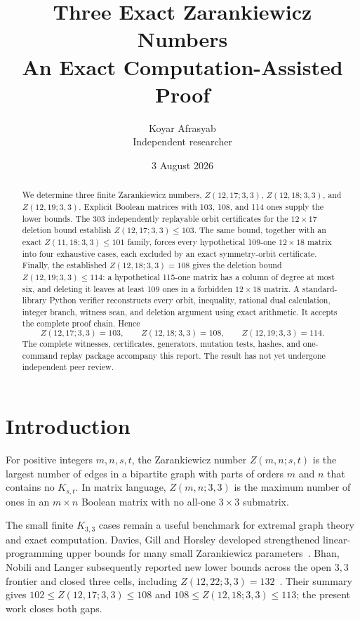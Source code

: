 \documentclass[11pt]{article}
\title{Three Exact Zarankiewicz Numbers\\\large An Exact Computation-Assisted Proof}
\author{Koyar Afrasyab\\Independent researcher}
\date{3 August 2026}
\begin{document}
\maketitle

\begin{abstract}
We determine three finite Zarankiewicz numbers, $Z(12,17;3,3)$, $Z(12,18;3,3)$, and $Z(12,19;3,3)$. Explicit Boolean matrices with 103, 108, and 114 ones supply the lower bounds. The 303 independently replayable orbit certificates for the $12\times17$ deletion bound establish $Z(12,17;3,3)\le103$. The same bound, together with an exact $Z(11,18;3,3)\le101$ family, forces every hypothetical 109-one $12\times18$ matrix into four exhaustive cases, each excluded by an exact symmetry-orbit certificate. Finally, the established $Z(12,18;3,3)=108$ gives the deletion bound $Z(12,19;3,3)\le114$: a hypothetical 115-one matrix has a column of degree at most six, and deleting it leaves at least 109 ones in a forbidden $12\times18$ matrix. A standard-library Python verifier reconstructs every orbit, inequality, rational dual calculation, integer branch, witness scan, and deletion argument using exact arithmetic. It accepts the complete proof chain. Hence
\[
\boxed{Z(12,17;3,3)=103,\qquad Z(12,18;3,3)=108,\qquad Z(12,19;3,3)=114}.
\]
The complete witnesses, certificates, generators, mutation tests, hashes, and one-command replay package accompany this report. The result has not yet undergone independent peer review.
\end{abstract}

\section{Introduction}
For positive integers $m,n,s,t$, the Zarankiewicz number $Z(m,n;s,t)$ is the largest number of edges in a bipartite graph with parts of orders $m$ and $n$ that contains no $K_{s,t}$. In matrix language, $Z(m,n;3,3)$ is the maximum number of ones in an $m\times n$ Boolean matrix with no all-one $3\times3$ submatrix.

The small finite $K_{3,3}$ cases remain a useful benchmark for extremal graph theory and exact computation. Davies, Gill and Horsley developed strengthened linear-programming upper bounds for many small Zarankiewicz parameters~\cite{DGH}. Bhan, Nobili and Langer subsequently reported new lower bounds across the open $3,3$ frontier and closed three cells, including $Z(12,22;3,3)=132$~\cite{BNRL}. Their summary gives $102\leq Z(12,17;3,3)\leq108$ and $108\leq Z(12,18;3,3)\leq113$; the present work closes both gaps.
\end{document}
